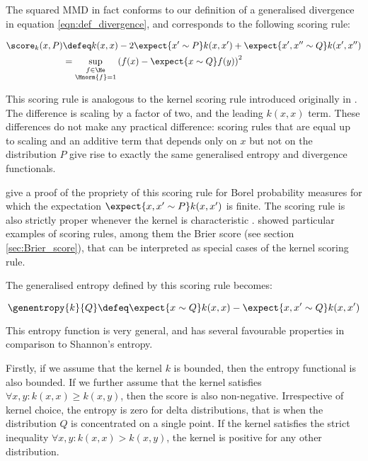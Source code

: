 The squared MMD in fact conforms to our definition of a generalised divergence in equation \eqref{eqn:def_divergence}, and corresponds to the following scoring rule:

\begin{align}
	\score_{k}(x,P) &\defeq k(x,x) - 2 \expect{x'\sim P} k(x,x') + \expect{x',x''\sim Q}k(x',x'')\\
		&=  \sup_{\substack{f\in\He\\\Hnorm{f}=1}}\left( f(x)- \expect{x\sim Q} f(y) \right)^2
\end{align}

This scoring rule is analogous to the kernel scoring rule introduced originally in \cite{DawidAncientpaper}. The difference is scaling by a factor of two, and the leading $k(x,x)$ term. These differences do not make any practical difference: scoring rules that are equal up to scaling and an additive term that depends only on $x$ but not on the distribution $P$ give rise to exactly the same generalised entropy and divergence functionals.

\cite{GneitingRaftery} give a proof of the propriety of this scoring rule for Borel probability measures for which the expectation $\expect{x,x'\sim P} k(x,x')$ is finite. The scoring rule is also strictly proper whenever the kernel is characteristic \cite{Sripedimbudur}. \cite{GneitingRaftery} showed particular examples of scoring rules, among them the Brier score (see section \ref{sec:Brier_score}), that can be interpreted as special cases of the kernel scoring rule.

The generalised entropy defined by this scoring rule becomes:

\begin{equation}
	\genentropy{k}{Q} \defeq \expect{x\sim Q} k(x,x) - \expect{x,x'\sim Q} k(x,x')
\end{equation}

This entropy function is very general, and has several favourable properties in comparison to Shannon's entropy.

Firstly, if we assume that the kernel $k$ is bounded, then the entropy functional is also bounded. If we further assume that the kernel satisfies $\forall x,y: k(x,x)\geq k(x,y)$, then the score is also non-negative. Irrespective of kernel choice, the entropy is zero for delta distributions, that is when the distribution $Q$ is concentrated on a single point. If the kernel satisfies the strict inequality $\forall x,y: k(x,x) > k(x,y)$, the kernel is positive for any other distribution.

